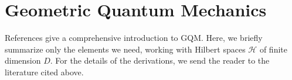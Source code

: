 \documentclass[%
 reprint,
 superscriptaddress,
 aps,
 pra,
]{revtex4-2}
\theoremstyle{definition}
\begin{document}






\section{Geometric Quantum Mechanics}
\label{sec:GQM}

References
\cite{STROCCHI1966ComplexCoordinatesQuantum,Mielnik1968GeometryQuantumStates,Kibble1979GeometrizationQuantumMechanics,Heslot1985QuantumMechanicsClassical,Page1987GeometricalDescriptionBerrys,Anandan1990GeometryQuantumEvolution,Gibbons1992TypicalStatesDensity,Ashtekar1999GeometricalFormulationQuantum,Brody2001GeometricQuantumMechanics,Bengtsson2017GeometryQuantumStates,Carinena2007GeometrizationQuantumMechanics,Chruscinski2006GeometricAspectsQuantum,Marmo2010GeometricalDescriptionQuantum,Avron2020ElementaryIntroductionGeometry,Pastorello2015GeometricHamiltonianFormulation,Pastorello2015GeometricHamiltonianDescription,Pastorello2016GeometricHamiltonianQuantum} give a comprehensive introduction to GQM. Here, we briefly summarize only the
elements we need, working with Hilbert spaces $\mathcal{H}$ of finite dimension $D$.
For the details of the derivations, we send the reader to the literature cited above.
\end{document}
